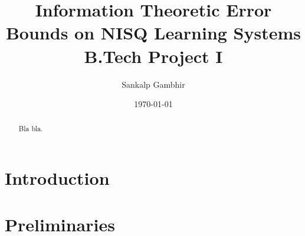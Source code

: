 \documentclass[
    paper=a4, 
    lang=en, 
    font=kpfonts, 
    hanging-titles=true,
    draft
]
{skrapport}
\title{
    {Information Theoretic Error Bounds on NISQ Learning Systems} \\
    {\large B.Tech Project I}
    }
\author[sgambhir@iitb.ac.in]{Sankalp Gambhir}
\date{\today}
\begin{document}
    \begin{titlepage}
        \maketitle
        \begin{abstract}
            Bla bla.
        \end{abstract}        
    \end{titlepage}

    \tableofcontents

    \section{Introduction}
        \label{sec:intro}
        
    
    \section{Preliminaries}
        \label{sec:prelim}
        

    \printbibliography
\end{document}
